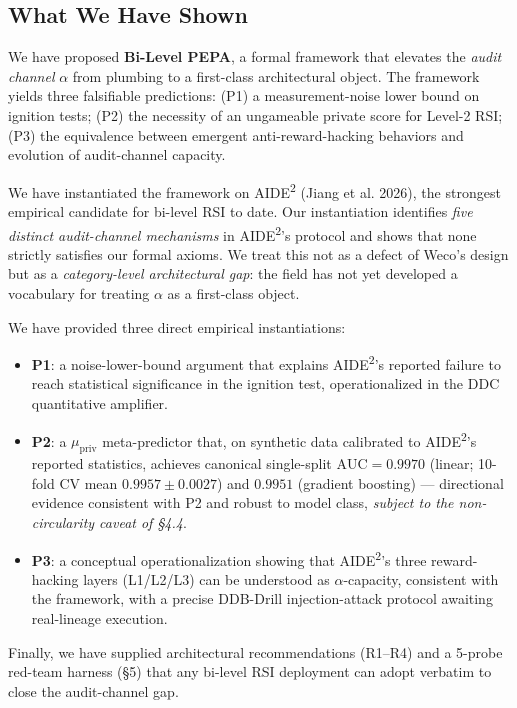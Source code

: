
\subsection{What We Have Shown}

We have proposed \textbf{Bi-Level PEPA}, a formal framework that elevates the \emph{audit channel} $\alpha$ from plumbing to a first-class architectural object. The framework yields three falsifiable predictions: (P1) a measurement-noise lower bound on ignition tests; (P2) the necessity of an ungameable private score for Level-2 RSI; (P3) the equivalence between emergent anti-reward-hacking behaviors and evolution of audit-channel capacity.

We have instantiated the framework on AIDE\textsuperscript{2} (Jiang et al. 2026), the strongest empirical candidate for bi-level RSI to date. Our instantiation identifies \emph{five distinct audit-channel mechanisms} in AIDE\textsuperscript{2}'s protocol and shows that none strictly satisfies our formal axioms. We treat this not as a defect of Weco's design but as a \emph{category-level architectural gap}: the field has not yet developed a vocabulary for treating $\alpha$ as a first-class object.

We have provided three direct empirical instantiations:
\begin{itemize}
    \item \textbf{P1}: a noise-lower-bound argument that explains AIDE\textsuperscript{2}'s reported failure to reach statistical significance in the ignition test, operationalized in the DDC quantitative amplifier.
    \item \textbf{P2}: a $\mu_{\text{priv}}$ meta-predictor that, on synthetic data calibrated to AIDE\textsuperscript{2}'s reported statistics, achieves canonical single-split $\text{AUC}=0.9970$ (linear; 10-fold CV mean $0.9957\pm0.0027$) and $0.9951$ (gradient boosting) --- directional evidence consistent with P2 and robust to model class, \emph{subject to the non-circularity caveat of \S4.4}.
    \item \textbf{P3}: a conceptual operationalization showing that AIDE\textsuperscript{2}'s three reward-hacking layers (L1/L2/L3) can be understood as $\alpha$-capacity, consistent with the framework, with a precise DDB-Drill injection-attack protocol awaiting real-lineage execution.
\end{itemize}

Finally, we have supplied architectural recommendations (R1--R4) and a 5-probe red-team harness (\S5) that any bi-level RSI deployment can adopt verbatim to close the audit-channel gap.

